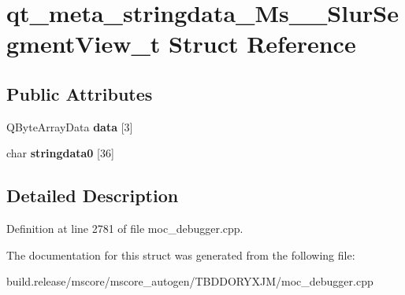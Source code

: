 \hypertarget{structqt__meta__stringdata___ms_____slur_segment_view__t}{}\section{qt\+\_\+meta\+\_\+stringdata\+\_\+\+Ms\+\_\+\+\_\+\+Slur\+Segment\+View\+\_\+t Struct Reference}
\label{structqt__meta__stringdata___ms_____slur_segment_view__t}
\subsection*{Public Attributes}
\begin{DoxyCompactItemize}
\item 
\mbox{\label{structqt__meta__stringdata___ms_____slur_segment_view__t_a3565354644fb97fb7c72e26636b928c3}} 
Q\+Byte\+Array\+Data {\bfseries data} \mbox{[}3\mbox{]}
\item 
\mbox{\label{structqt__meta__stringdata___ms_____slur_segment_view__t_ac4caaa2eddca0c3bebbcbf078a04ffbe}} 
char {\bfseries stringdata0} \mbox{[}36\mbox{]}
\end{DoxyCompactItemize}


\subsection{Detailed Description}


Definition at line 2781 of file moc\+\_\+debugger.\+cpp.



The documentation for this struct was generated from the following file\+:\begin{DoxyCompactItemize}
\item 
build.\+release/mscore/mscore\+\_\+autogen/\+T\+B\+D\+D\+O\+R\+Y\+X\+J\+M/moc\+\_\+debugger.\+cpp\end{DoxyCompactItemize}
